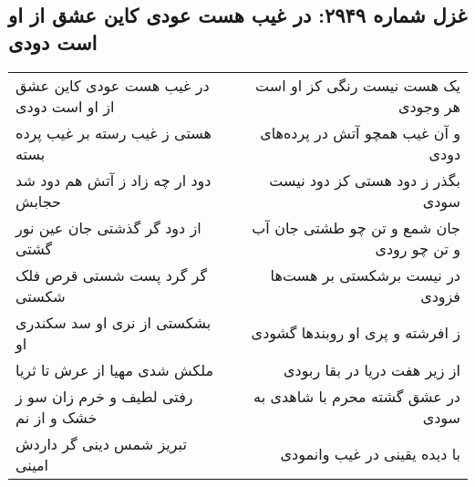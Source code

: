 \begin{center}
\section*{غزل شماره ۲۹۴۹: در غیب هست عودی کاین عشق از او است دودی}
\label{sec:2949}
\begin{longtable}{l p{0.5cm} r}
در غیب هست عودی کاین عشق از او است دودی
&&
یک هست نیست رنگی کز او است هر وجودی
\\
هستی ز غیب رسته بر غیب پرده بسته
&&
و آن غیب همچو آتش در پرده‌های دودی
\\
دود ار چه زاد ز آتش هم دود شد حجابش
&&
بگذر ز دود هستی کز دود نیست سودی
\\
از دود گر گذشتی جان عین نور گشتی
&&
جان شمع و تن چو طشتی جان آب و تن چو رودی
\\
گر گرد پست شستی قرص فلک شکستی
&&
در نیست برشکستی بر هست‌ها فزودی
\\
بشکستی از نری او سد سکندری او
&&
ز افرشته و پری او روبندها گشودی
\\
ملکش شدی مهیا از عرش تا ثریا
&&
از زیر هفت دریا در بقا ربودی
\\
رفتی لطیف و خرم زان سو ز خشک و از نم
&&
در عشق گشته محرم با شاهدی به سودی
\\
تبریز شمس دینی گر داردش امینی
&&
با دیده یقینی در غیب وانمودی
\\
\end{longtable}
\end{center}
